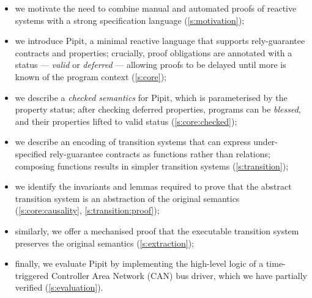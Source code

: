 \begin{itemize}
  \item we motivate the need to combine manual and automated proofs of reactive systems with a strong specification language (\autoref{s:motivation});
  \item we introduce Pipit, a minimal reactive language that supports rely-guarantee contracts and properties; crucially, proof obligations are annotated with a status --- \emph{valid} or \emph{deferred} --- allowing proofs to be delayed until more is known of the program context (\autoref{s:core});
  \item we describe a \emph{checked semantics} for Pipit, which is parameterised by the property status; after checking deferred properties, programs can be \emph{blessed}, and their properties lifted to valid status (\autoref{s:core:checked});
  \item we describe an encoding of transition systems that can express under-specified rely-guarantee contracts as functions rather than relations; composing functions results in simpler transition systems (\autoref{s:transition});
  \item we identify the invariants and lemmas required to prove that the abstract transition system is an abstraction of the original semantics (\autoref{s:core:causality}, \autoref{s:transition:proof});
  \item similarly, we offer a mechanised proof that the executable transition system preserves the original semantics (\autoref{s:extraction});
  \item finally, we evaluate Pipit by implementing the high-level logic of a time-triggered Controller Area Network (CAN) bus driver, which we have partially verified (\autoref{s:evaluation}).
\end{itemize}
